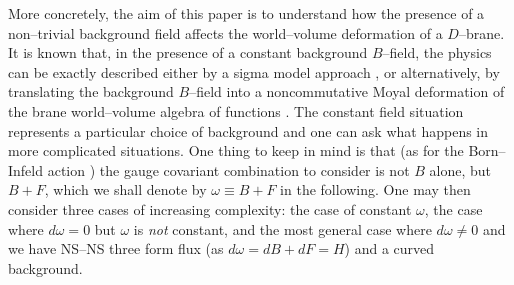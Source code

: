 \documentclass[a4paper,11pt]{article}
\begin{document}
More concretely, the aim of this paper is to understand how the presence of
a non--trivial background field affects the world--volume deformation of a
$D$--brane. It is known that, in the presence of a constant background
$B$--field, the physics can be exactly described either by a sigma model
approach \cite{AFM, Fradkin-Tseytlin, BCZ, Dorn-Otto, ACNY, CLNY, Tseytlin,
Laidlaw}, or alternatively, by translating the background $B$--field into a
noncommutative Moyal deformation of the brane world--volume algebra of
functions \cite{Schomerus, Seiberg-Witten}. The constant field situation
represents a particular choice of background and one can ask what happens
in more complicated situations. One thing to keep in mind is that (as for
the Born--Infeld action \cite{Leigh, Polchinski, Witten-2}) the gauge
covariant combination to consider is not $B$ alone, but $B+F$, which we
shall denote by $\omega \equiv B+F$ in the following. One may then consider
three cases of increasing complexity: the case of constant $\omega$, the
case where $d\omega=0$ but $\omega$ is \textit{not} constant, and the most
general case where $d\omega \not = 0$ and we have NS--NS three form flux
(as $d\omega = dB + dF = H$) and a curved background.
\end{document}
